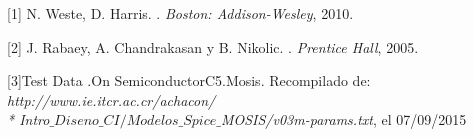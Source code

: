 \documentclass[12pt,a4paper]{article} %
\begin{document}
\begin{thebibliography}{3}


[1] N. Weste, D. Harris. 
.
\newblock \emph{Boston: Addison-Wesley}, 2010.

[2] J. Rabaey, A. Chandrakasan y B. Nikolic. 
.
\newblock \emph{Prentice Hall}, 2005.

[3]Test Data .On SemiconductorC5.Mosis. Recompilado de:
\newblock \emph{http://www.ie.itcr.ac.cr/achacon/ \\* Intro$\_Diseno\_CI/Modelos\_Spice\_$MOSIS/v03m-params.txt}, el 07/09/2015

\end{thebibliography}
\end{document}
